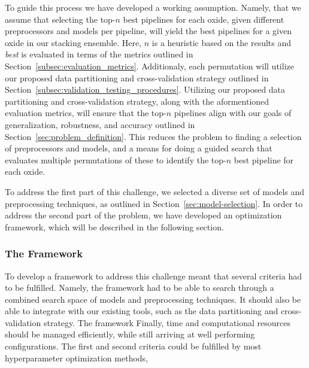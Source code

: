 To guide this process we have developed a working assumption.
Namely, that we assume that selecting the top-$n$ best pipelines for each oxide, given different preprocessors and models per pipeline, will yield the best pipelines for a given oxide in our stacking ensemble.
Here, $n$ is a heuristic based on the results and \textit{best} is evaluated in terms of the metrics outlined in Section~\ref{subsec:evaluation_metrics}.
Additionaly, each permutation will utilize our proposed data partitioning and cross-validation strategy outlined in Section~\ref{subsec:validation_testing_procedures}.
Utilizing our proposed data partitioning and cross-validation strategy, along with the aformentioned evaluation metrics, will ensure that the top-$n$ pipelines align with our goals of generalization, robustness, and accuracy outlined in Section~\ref{sec:problem_definition}.
This reduces the problem to finding a selection of preprocessors and models, and a means for doing a guided search that evaluates multiple permutations of these to identify the top-$n$ best pipeline for each oxide.

To address the first part of this challenge, we selected a diverse set of models and preprocessing techniques, as outlined in Section~\ref{sec:model-selection}.
In order to address the second part of the problem, we have developed an optimization framework, which will be described in the following section.

\subsubsection{The Framework}

To develop a framework to address this challenge meant that several criteria had to be fulfilled.
Namely, the framework had to be able to search through a combined search space of models and preprocessing techniques.
It should also be able to integrate with our existing tools, such as the data partitioning and cross-validation strategy.
The framework
Finally, time and computational resources should be managed efficiently, while still arriving at well performing configurations.
The first and second criteria could be fulfilled by most hyperparameter optimization methods,



